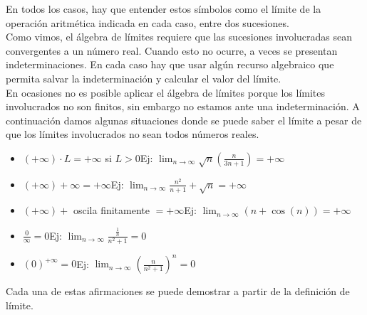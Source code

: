 \documentclass[../Teoría.root.tex]{subfiles}
\begin{document}
    En todos los casos, hay que entender estos símbolos como el límite de la operación aritmética indicada en cada caso, entre dos sucesiones.\\
    Como vimos, el álgebra de límites requiere que las sucesiones involucradas sean convergentes a un número real. Cuando esto no ocurre, a veces se presentan indeterminaciones. En cada caso hay que usar algún recurso algebraico que permita salvar la indeterminación y calcular el valor del límite.\\
    En ocasiones no es posible aplicar el álgebra de límites porque los límites involucrados no son finitos, sin embargo no estamos ante una indeterminación. A continuación damos algunas situaciones donde se puede saber el límite a pesar de que los límites involucrados no sean todos números reales.
    \begin{itemize}
        \item \((+\infty)\cdot L=+\infty\) si \(L>0\)\tab Ej: \(\lim_{n\to\infty}\sqrt{n}\left(\frac{n}{3n+1}\right)=+\infty\)
        \item \((+\infty)+\infty=+\infty\)\tab Ej: \(\lim_{n\to\infty}\frac{n^2}{n+1}+\sqrt{n}=+\infty\)
        \item \((+\infty)+\) oscila finitamente \(=+\infty\)\tab Ej: \(\lim_{n\to\infty}(n+\cos(n))=+\infty\)
        \item \(\frac{0}{\infty}=0\)\tab Ej: \(\lim_{n\to\infty}\frac{\frac{1}{n}}{n^2+1}=0\)
        \item \((0)^{+\infty}=0\)\tab Ej: \(\lim_{n\to\infty}\left(\frac{n}{n^2+1}\right)^n=0\)
    \end{itemize}
    Cada una de estas afirmaciones se puede demostrar a partir de la definición de límite.
\end{document}
